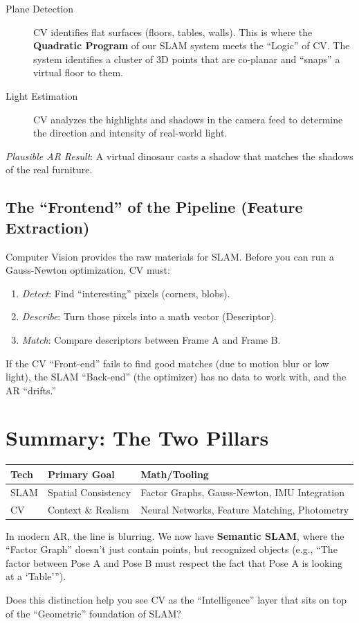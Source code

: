 \documentclass[11pt]{article}
\begin{document}
\begin{description}
\item[{Plane Detection}] CV identifies flat surfaces
(floors, tables, walls). This is where the \textbf{Quadratic
Program} of our SLAM system meets the ``Logic'' of CV.
The system identifies a cluster of 3D points that are
co-planar and ``snaps'' a virtual floor to them.
\item[{Light Estimation}] CV analyzes the highlights and
shadows in the camera feed to determine the direction
and intensity of real-world light.
\end{description}

\emph{Plausible AR Result}: A virtual dinosaur casts a
shadow that matches the shadows of the real furniture.
\subsection{The ``Frontend'' of the Pipeline (Feature Extraction)}
\label{sec:org8815d52}
Computer Vision provides the raw materials for
SLAM.  Before you can run a Gauss-Newton optimization,
CV must:
\begin{enumerate}
\item \emph{Detect}: Find ``interesting'' pixels (corners,
blobs).
\item \emph{Describe}: Turn those pixels into a math vector
(Descriptor).
\item \emph{Match}: Compare descriptors between Frame A and
Frame B.
\end{enumerate}

If the CV ``Front-end'' fails to find good matches (due
to motion blur or low light), the SLAM ``Back-end'' (the
optimizer) has no data to work with, and the AR
``drifts.''
\section{Summary: The Two Pillars}
\label{sec:orgf6d8b20}
\begin{center}
\begin{tabularx}{\linewidth}{llX}
\textbf{Tech} & \textbf{Primary Goal} & \textbf{Math/Tooling}\\
\hline
SLAM & Spatial Consistency & Factor Graphs, Gauss-Newton, IMU Integration\\
CV & Context \& Realism & Neural Networks, Feature Matching, Photometry\\
\end{tabularx}
\end{center}

In modern AR, the line is blurring. We now have
\textbf{Semantic SLAM}, where the ``Factor Graph'' doesn't
just contain points, but recognized objects (e.g., ``The
factor between Pose A and Pose B must respect the fact
that Pose A is looking at a `Table'''). 

Does this distinction help you see CV as the
``Intelligence'' layer that sits on top of the
``Geometric'' foundation of SLAM?
\end{document}
